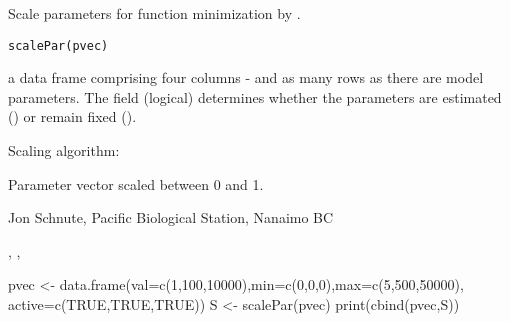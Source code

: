 \documentclass[letterpaper]{book}
\begin{document}
\begin{Description}\relax
Scale parameters for function minimization by .
\end{Description}
\begin{Usage}
\begin{verbatim}scalePar(pvec)\end{verbatim}
\end{Usage}
\begin{Arguments}
\begin{ldescription}
\item[\code{pvec}] a data frame comprising four columns - 
 and as many rows as there are model
parameters. The  field (logical) determines whether the 
parameters are estimated () or remain fixed ().
\end{ldescription}
\end{Arguments}
\begin{Details}\relax
Scaling algorithm:  
\end{Details}
\begin{Value}
Parameter vector scaled between 0 and 1.
\end{Value}
\begin{Author}\relax
Jon Schnute, Pacific Biological Station, Nanaimo BC
\end{Author}
\begin{SeeAlso}\relax
{}, , 
\end{SeeAlso}
\begin{Examples}
\begin{ExampleCode}
pvec <- data.frame(val=c(1,100,10000),min=c(0,0,0),max=c(5,500,50000),
        active=c(TRUE,TRUE,TRUE))
S    <- scalePar(pvec)
print(cbind(pvec,S))
\end{ExampleCode}
\end{Examples}
\end{document}
